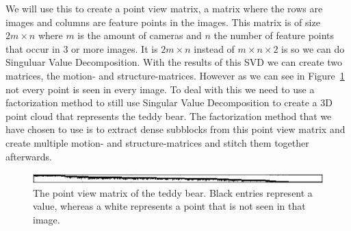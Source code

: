 We will use this to create a point view matrix, a matrix where the rows are images and columns are feature points in the images.
This matrix is of size $2m \times n$ where $m$ is the amount of cameras and $n$ the number of feature points that occur in 3 or more images. 
It is $2m \times n$ instead of $m \times n \times 2$ is so we can do Singuluar Value Decomposition.
With the results of this SVD we can create two matrices, the motion- and structure-matrices.
However as we can see in Figure~\ref{fig:pvm} not every point is seen in every image.
To deal with this we need to use a factorization method to still use Singular Value Decomposition to create a 3D point cloud that represents the teddy bear.
The factorization method that we have chosen to use is to extract dense subblocks from this point view matrix  and create multiple motion- and structure-matrices and stitch them together afterwards.

\begin{figure}[ht]
	\centering
	\includegraphics[width=\textwidth]{pvm}
	\caption{The point view matrix of the teddy bear. Black entries represent a value, whereas a white represents a point that is not seen in that image.}
	\label{fig:pvm}
\end{figure}

